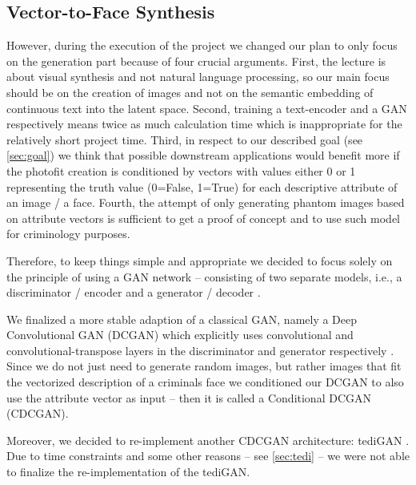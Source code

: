 \documentclass[12pt, a4paper]{article}
\begin{document}
\subsection{Vector-to-Face Synthesis}\label{sec:vec-to-face}
However, during the execution of the project we changed our plan to only focus on the generation part because of four
crucial arguments. First, the lecture is about visual synthesis and not natural language processing, so our main focus
should be on the creation of images and not on the semantic embedding of continuous text into the latent space.
Second, training a text-encoder and a GAN respectively means twice as much calculation time which is inappropriate for
the relatively short project time. Third, in respect to our described goal (see \ref{sec:goal}) we think that possible
downstream applications would benefit more if the photofit creation is conditioned by vectors with values either 0 or 1
representing the truth value (0=False, 1=True) for each descriptive attribute of an image / a face. Fourth, the attempt
of only generating phantom images based on attribute vectors is sufficient to get a proof of concept and to use such 
model for criminology purposes.

Therefore, to keep things simple and appropriate we decided to focus solely on the principle of using a GAN network --
consisting of two separate models, i.e., a discriminator / encoder and a generator / decoder \cite{gan}.

We finalized a more stable adaption of a classical GAN, namely a Deep Convolutional GAN (DCGAN) which explicitly  uses
convolutional and convolutional-transpose layers in the discriminator and generator respectively \cite{dcgan}.
Since we do not just need to generate random images, but rather images that fit the vectorized description of
a criminals face we conditioned our DCGAN to also use the attribute vector as input -- then it is called a Conditional
DCGAN (CDCGAN).

Moreover, we decided to re-implement another CDCGAN architecture: tediGAN \cite{Xia_2021_CVPR}.
Due to time constraints and some other reasons -- see \ref{sec:tedi} -- we were not able to finalize the
re-implementation of the tediGAN.
\end{document}
